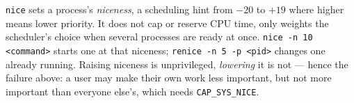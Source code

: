
\texttt{nice} sets a process's \emph{niceness}, a scheduling hint from $-20$ to
$+19$ where higher means lower priority. It does not cap or reserve CPU time,
only weights the scheduler's choice when several processes are ready at once.
\texttt{nice -n 10 <command>} starts one at that niceness; \texttt{renice -n 5
-p <pid>} changes one already running. Raising niceness is unprivileged,
\emph{lowering} it is not --- hence the failure above: a user may make their own
work less important, but not more important than everyone else's, which needs
\texttt{CAP\_SYS\_NICE}.
